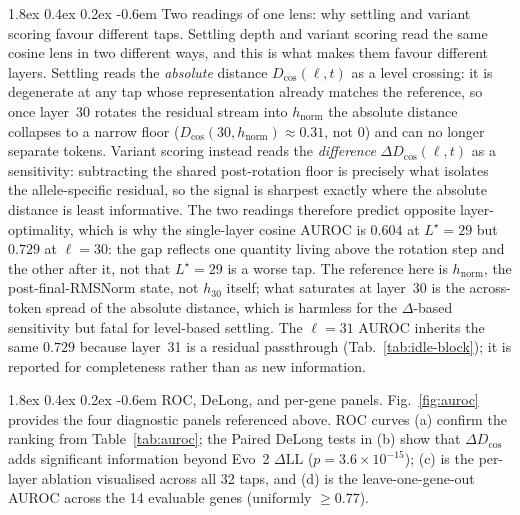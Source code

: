 \documentclass{article}
\makeatletter
\renewcommand\paragraph{\@startsection{paragraph}{4}{\z@}%
  {1.8ex \@plus 0.4ex \@minus 0.2ex}%
  {-0.6em}%
{\normalfont\normalsize\bfseries}}
\theoremstyle{plain}
\theoremstyle{definition}
\theoremstyle{remark}
\newcommand{\hnorm}{h_{\mathrm{norm}}}
\newcommand{\Dcos}{D_{\cos}}
\newcommand{\DDcos}{\Delta D_{\cos}}
\makeatother
\begin{document}
\paragraph{Two readings of one lens: why settling and variant scoring favour different taps.}
Settling depth and variant scoring read the same cosine lens in two
different ways, and this is what makes them favour different layers.
Settling reads the \emph{absolute} distance $\Dcos(\ell,t)$ as a level
crossing: it is degenerate at any tap whose representation already
matches the reference, so once layer~30 rotates the residual stream into
$\hnorm$ the absolute distance collapses to a narrow floor
($\Dcos(30,\hnorm)\!\approx\!0.31$, not $0$) and can no longer separate
tokens. Variant scoring instead reads the \emph{difference}
$\DDcos(\ell,t)$ as a sensitivity: subtracting the shared post-rotation
floor is precisely what isolates the allele-specific residual, so the
signal is sharpest exactly where the absolute distance is least
informative. The two readings therefore predict opposite
layer-optimality, which is why the single-layer cosine AUROC is $0.604$
at $L^{\star}\!=\!29$ but $0.729$ at $\ell\!=\!30$: the gap reflects one
quantity living above the rotation step and the other after it, not that
$L^{\star}\!=\!29$ is a worse tap. The reference here is $\hnorm$, the
post-final-RMSNorm state, not $h_{30}$ itself; what saturates at
layer~30 is the across-token spread of the absolute distance, which is
harmless for the $\Delta$-based sensitivity but fatal for level-based
settling. The $\ell\!=\!31$ AUROC inherits the same $0.729$ because
layer~31 is a residual passthrough (Tab.~\ref{tab:idle-block}); it is
reported for completeness rather than as new information.

\paragraph{ROC, DeLong, and per-gene panels.}
Fig.~\ref{fig:auroc} provides the four diagnostic panels referenced
above. ROC curves (a) confirm the ranking from
Table~\ref{tab:auroc}; the Paired DeLong tests in (b) show that
$\DDcos$ adds significant information beyond Evo~2 $\Delta\textrm{LL}$
($p\!=\!3.6\!\times\!10^{-15}$); (c) is the per-layer ablation visualised
across all 32 taps, and (d) is the leave-one-gene-out AUROC across the
14 evaluable genes (uniformly $\ge 0.77$).
\end{document}
